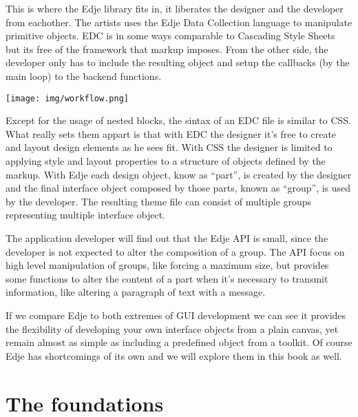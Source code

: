 \documentclass[12pt,a4paper,english]{book}
\begin{document}
This is where the Edje library fits in, it liberates the designer and the
developer from eachother. The artists uses the Edje Data Collection language to
manipulate primitive objects. EDC is in some ways comparable to Cascading Style
Sheets but its free of the framework that markup imposes. From the other side,
the developer only has to include the resulting object and setup the callbacks
(by the main loop) to the backend functions.

{\hfill\texttt{[image: img/workflow.png]}\hfill}

Except for the usage of nested blocks, the sintax of an EDC file is similar to
CSS. What really sets them appart is that with EDC the designer it's free to
create and layout design elements as he sees fit. With CSS the designer is
limited to applying style and layout properties to a structure of objects
defined by the markup. With Edje each design object, know as ``part'', is created
by the designer and the final interface object composed by those parts, known
as ``group'', is used by the developer. The resulting theme file can consist of
multiple groups representing multiple interface object.

The application developer will find out that the Edje API is small, since the
developer is not expected to alter the composition of a group. The API focus on
high level manipulation of groups, like forcing a maximum size, but provides
some functions to alter the content of a part when it's necessary to transmit
information, like altering a paragraph of text with a message.

If we compare Edje to both extremes of GUI development we can see it provides
the flexibility of developing your own interface objects from a plain canvas,
yet remain almost as simple as including a predefined object from a toolkit. Of
course Edje has shortcomings of its own and we will explore them in this book
as well.



\hypertarget{the-foundations}{}
\section{The foundations}
\label{the-foundations}
\end{document}
